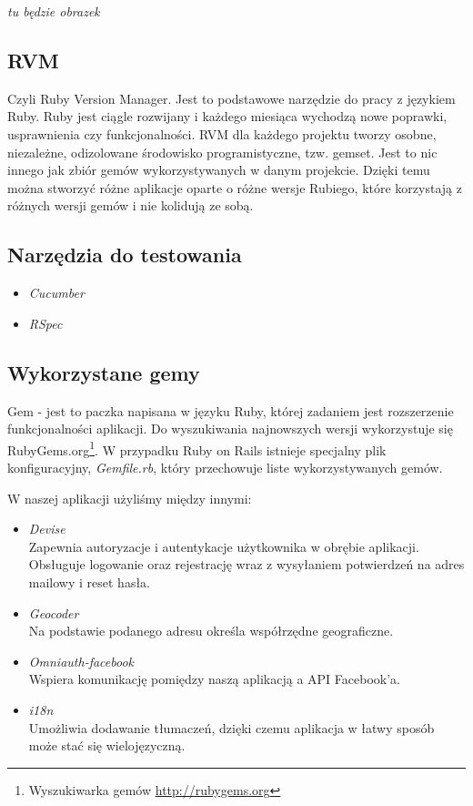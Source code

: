   \textit{tu będzie obrazek}

  \subsection{RVM}
  Czyli Ruby Version Manager. Jest to podstawowe narzędzie do pracy z językiem Ruby. Ruby jest ciągle rozwijany i każdego miesiąca wychodzą nowe poprawki, usprawnienia czy funkcjonalności. RVM dla każdego projektu tworzy osobne, niezależne, odizolowane środowisko programistyczne, tzw. gemset. Jest to nic innego jak zbiór gemów wykorzystywanych w danym projekcie. Dzięki temu można stworzyć różne aplikacje oparte o różne wersje Rubiego, które korzystają z różnych wersji gemów i nie kolidują ze sobą.

  \subsection{Narzędzia do testowania}
    \begin{itemize}
      \item \emph{Cucumber}
      \item \emph{RSpec}
    \end{itemize}

  \subsection{Wykorzystane gemy}
    Gem - jest to paczka napisana w języku Ruby, której zadaniem jest rozszerzenie funkcjonalności aplikacji. Do wyszukiwania najnowszych wersji wykorzystuje się RubyGems.org\footnote{Wyszukiwarka gemów \url{http://rubygems.org}}. W przypadku Ruby on Rails istnieje specjalny plik konfiguracyjny, \emph{Gemfile.rb}, który przechowuje liste wykorzystywanych gemów.

    W naszej aplikacji użyliśmy między innymi:
    \begin{itemize}
      \item \emph{Devise} \\ Zapewnia autoryzacje i autentykacje użytkownika w obrębie aplikacji. Obsługuje logowanie oraz rejestrację wraz z wysyłaniem potwierdzeń na adres mailowy i reset hasła.
      \item \emph{Geocoder} \\ Na podstawie podanego adresu określa współrzędne geograficzne.
      \item \emph{Omniauth-facebook} \\ Wspiera komunikację pomiędzy naszą aplikacją a API Facebook'a.
      \item \emph{i18n} \\ Umożliwia dodawanie tłumaczeń, dzięki czemu aplikacja w łatwy sposób może stać się wielojęzyczną.
    \end{itemize}
